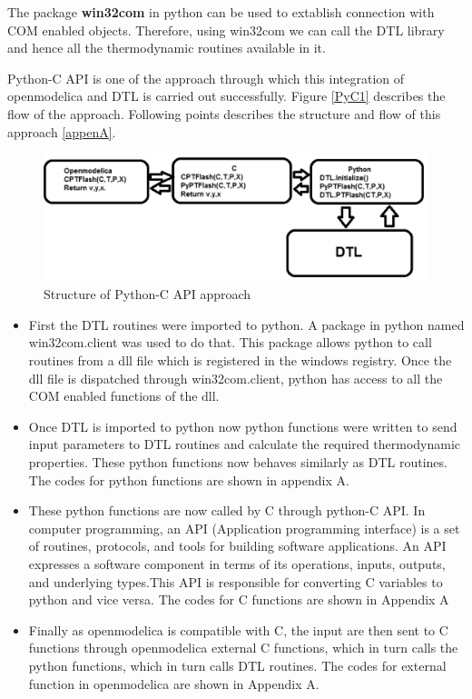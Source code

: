 \documentclass[12pt]{report}
\begin{document}
The package \textbf{win32com} in python can be used to extablish connection with COM enabled objects. Therefore, using win32com we can call the DTL library and hence all the thermodynamic routines available in it.

Python-C API is one of the approach through which this integration of openmodelica and DTL is carried out successfully. Figure \ref{PyC1} describes the flow of the approach. Following points describes the structure and flow of this approach \ref{appenA}.

\begin{figure}
\centering
\includegraphics[width=1\linewidth]{PytC1}
\caption{Structure of Python-C API approach}
\label{fig:PyC1}
\end{figure}
\begin{itemize}
\item{First the DTL routines were imported to python. A package in python named win32com.client was used to do that. This package allows python to call routines from a dll file which is registered in the windows registry. Once the dll file is dispatched through win32com.client, python has access to all the COM enabled functions of the dll.}
\item{Once DTL is imported to python now python functions were written to send input parameters to DTL routines and calculate the required thermodynamic properties. These python functions now behaves similarly as DTL routines. The codes for python functions are shown in appendix A.}
\item{These python functions are now called by C through python-C API. In computer programming, an API (Application programming interface) is a set of routines, protocols, and tools for building software applications. An API expresses a software component in terms of its operations, inputs, outputs, and underlying types.This API is responsible for converting C variables to python and vice versa. The codes for C functions are shown in Appendix A}
\item{Finally as openmodelica is compatible with C, the input are then sent to C functions through openmodelica external C functions, which in turn calls the python functions, which in turn calls DTL routines. The codes for external function in openmodelica are shown in Appendix A.}
\end{itemize}
\end{document}
